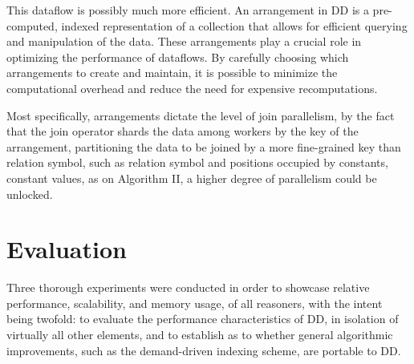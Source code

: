 \documentclass[sigconf,screen,review,natbib]{acmart}
\theoremstyle{definition}
\begin{document}
This dataflow is possibly much more efficient. An arrangement in DD is a pre-computed, indexed representation of a collection that allows
for efficient querying and manipulation of the data. These arrangements play a crucial role in optimizing the performance of dataflows. By carefully choosing
which arrangements to create and maintain, it is possible to minimize the computational overhead and reduce the need for expensive recomputations.

Most specifically, arrangements dictate the level of join parallelism, by the fact that the join operator shards the data among workers by the key of
the arrangement, partitioning the data to be joined by a more fine-grained key than relation symbol, such as relation symbol and positions occupied by constants,
constant values, as on Algorithm II, a higher degree of parallelism could be unlocked.
\section{Evaluation}
Three thorough experiments were conducted in order to showcase relative performance, scalability, and memory usage, of all reasoners, with the intent being twofold:
to evaluate the performance characteristics of DD, in isolation of virtually all other elements, and to establish as to whether general algorithmic
improvements, such as the demand-driven indexing scheme, are portable to DD.
\end{document}
